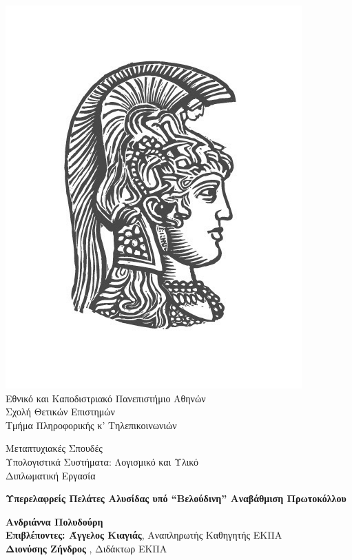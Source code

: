 \begin{center}
    
    \includegraphics[scale=0.8]{figures/logo_uoa.jpg}\\
    {\large Εθνικό και Καποδιστριακό Πανεπιστήμιο Αθηνών \\ 
    Σχολή Θετικών Επιστημών \\ 
    Τμήμα Πληροφορικής κ' Τηλεπικοινωνιών\\}
    \vspace{1cm}
    \begin{LARGE}
        Μεταπτυχιακές Σπουδές \\ 
        Υπολογιστικά Συστήματα: Λογισμικό και Υλικό\\
        \vspace{10mm}
        {Διπλωματική Εργασία}\\
        \vspace{0.8cm}
    \end{LARGE}
    {\textbf{\LARGE Υπερελαφρείς Πελάτες Αλυσίδας υπό ``Βελούδινη'' Αναβάθμιση Πρωτοκόλλου}}\\
    \vspace{2.5cm}


    \textbf{\large Ανδριάννα Πολυδούρη} \\ 
    \vspace{2.5cm} 
    \textbf{\large Επιβλέποντες: Άγγελος Κιαγιάς}\large , Αναπληρωτής Καθηγητής ΕΚΠΑ\\
    \hspace{0.95cm}
    \textbf{\large Διονύσης Ζήνδρος} \large, Διδάκτωρ ΕΚΠΑ
    \vspace{2cm}

    \date{Αθήνα, \\ 15η Ιουνίου 2020}
    \pagebreak
\end{center}